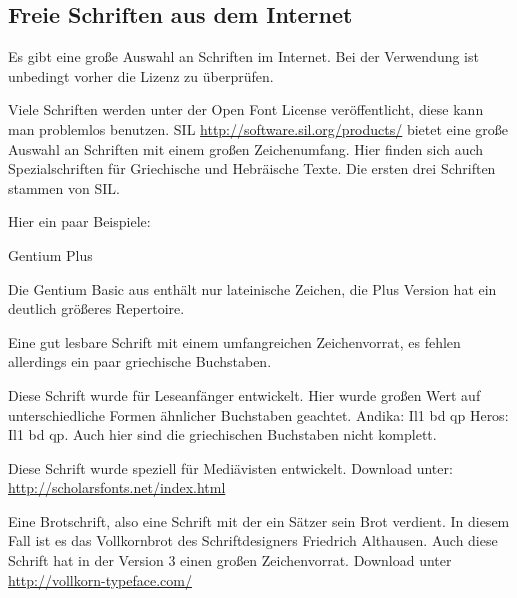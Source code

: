 \iffalse
\subsection{Freie Schriften aus dem Internet}

\newfontfamily{}
\newfontfamily{}
\newfontfamily{}
\newfontfamily{}
\newfontfamily{}

Es gibt eine große Auswahl an Schriften im Internet.
Bei der Verwendung ist unbedingt vorher die Lizenz zu überprüfen.

Viele Schriften werden unter der Open Font License veröffentlicht, diese kann man problemlos benutzen.
SIL \url{http://software.sil.org/products/} bietet eine große Auswahl an Schriften mit einem großen Zeichenumfang.
Hier finden sich auch Spezialschriften für Griechische und Hebräische Texte.
Die ersten drei Schriften stammen von SIL.

Hier ein paar Beispiele:

\begin{labeling}{Gentium Plus}
\item[Gentium Plus] Die Gentium Basic aus \TeXLive{} enthält nur lateinische Zeichen, 
	die Plus Version hat ein deutlich größeres Repertoire.
\item[Charis SIL] Eine gut lesbare Schrift mit einem umfangreichen Zeichenvorrat, 
	es fehlen allerdings ein paar griechische Buchstaben. 
\item[Andika] Diese Schrift wurde für Leseanfänger entwickelt. 
	Hier wurde großen Wert auf unterschiedliche Formen ähnlicher Buchstaben geachtet.
	Andika: {\ABfont Il1 bd qp} Heros: {\HEfont Il1 bd qp}.
	Auch hier sind die griechischen Buchstaben nicht komplett.
\item[Cardo] Diese Schrift wurde speziell für Mediävisten entwickelt. 
 Download unter: \url{http://scholarsfonts.net/index.html}
\item[Vollkorn] Eine Brotschrift, also eine Schrift mit der ein Sätzer sein Brot verdient. 
	In diesem Fall ist es das Vollkornbrot des Schriftdesigners Friedrich Althausen.
	Auch diese Schrift hat in der Version 3 einen großen Zeichenvorrat. 
	Download unter \url{http://vollkorn-typeface.com/}
\end{labeling}

